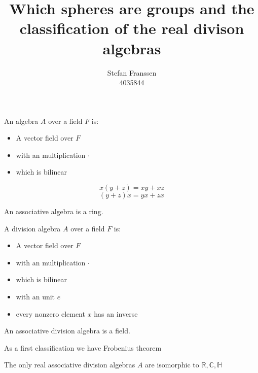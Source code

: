 \documentclass{beamer}
\title{Which spheres are groups and the classification of the real divison algebras}
\author{Stefan Franssen\\4035844}
\begin{document}
\begin{frame}
\maketitle
\end{frame}

\begin{frame}
An algebra $A$ over a field $F$ is:
\begin{itemize}
\item A vector field over $F$
\pause
\item with an multiplication $\cdot$
\pause
\item which is bilinear
\end{itemize}
\pause
\begin{theorem}
$$x(y + z) = xy + xz$$
$$(y + z)x = yx + zx$$
\end{theorem}
\pause
\begin{theorem}
An associative algebra is a ring.
\end{theorem}
\end{frame}

\begin{frame}
A division algebra $A$ over a field $F$ is:
\begin{itemize}
\item A vector field over $F$
\item with an multiplication $\cdot$
\item which is bilinear
\pause
\item with an unit $e$
\pause
\item every nonzero element $x$ has an inverse
\end{itemize}
\pause
\begin{theorem}
An associative division algebra is a field.
\end{theorem}
\end{frame}

\begin{frame}
As a first classification we have Frobenius theorem
\begin{theorem}
The only real associative division algebras $A$ are isomorphic to $\mathbb{R}, \mathbb{C},\mathbb{H}$
\end{theorem}
\end{frame}
\end{document}
